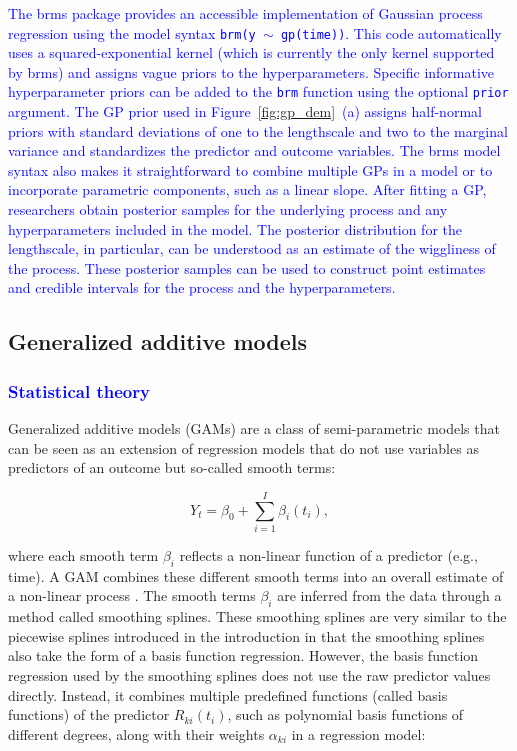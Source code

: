 \documentclass[man, floatsintext]{apa7}
\begin{document}
\textcolor{blue}{
  The brms package \parencite{R-brms} provides an accessible implementation of
  Gaussian process regression using the model syntax
    {\fontsize{10}{12}\selectfont\texttt{brm(y $\sim$ gp(time))}}. This code
  automatically uses a squared-exponential kernel (which is currently the only
  kernel supported by brms) and assigns vague priors to the hyperparameters.
  Specific informative hyperparameter priors can be added to the
    {\fontsize{10}{12}\selectfont\texttt{brm}} function using the optional
    {\fontsize{10}{12}\selectfont\texttt{prior}} argument. The GP prior used in
  Figure~\ref{fig:gp_dem}~(a) assigns half-normal priors with standard
  deviations of one to the lengthscale and two to the marginal variance and
  standardizes the predictor and outcome variables. The brms model syntax also
  makes it straightforward to combine multiple GPs in a model or to incorporate
  parametric components, such as a linear slope. After fitting a GP,
  researchers
  obtain posterior samples for the underlying process and any hyperparameters
  included in the model. The posterior distribution for the lengthscale, in
  particular, can be understood as an estimate of the wiggliness of the
  process.
  These posterior samples can be used to construct point estimates and credible
  intervals for the process and the hyperparameters.
}

\subsection{Generalized additive models}

\subsubsection{\textcolor{blue}{Statistical theory}}

Generalized additive models (GAMs) are a class of semi-parametric models that
can be seen as an extension of regression models that do not use variables as
predictors of an outcome but so-called smooth terms:

\begin{equation}
  Y_t = \beta_0 + \sum_{i = 1}^{I} \beta_i(t_i),
\end{equation}

\noindent where each smooth term $\beta_i$ reflects a non-linear function of a
predictor (e.g., time). A GAM combines these different smooth terms into an
overall estimate of a non-linear process \parencite{wood_generalized_2006,
  wood_inference_2020, hastie_generalized_1999}. The smooth terms $\beta_i$ are
inferred from the data through a method called smoothing splines. These
smoothing splines are very similar to the piecewise splines introduced in the
introduction in that the smoothing splines also take the form of a basis
function regression. However, the basis function regression used by the
smoothing splines does not use the raw predictor values directly. Instead, it
combines multiple predefined functions (called basis functions) of the
predictor $R_{ki}(t_i)$, such as polynomial basis functions of different
degrees, along with their weights $\alpha_{ki}$ in a regression model:
\end{document}
